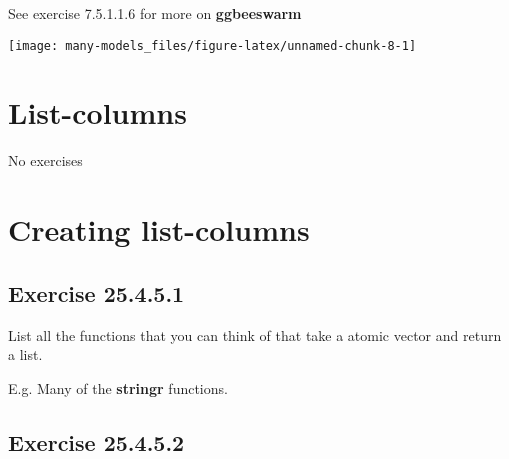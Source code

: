 \documentclass[]{book}
\newenvironment{Shaded}{\begin{snugshade}}{\end{snugshade}}
\newcommand{\DataTypeTok}[1]{\textcolor[rgb]{0.13,0.29,0.53}{#1}}
\newcommand{\KeywordTok}[1]{\textcolor[rgb]{0.13,0.29,0.53}{\textbf{#1}}}
\newcommand{\NormalTok}[1]{#1}
\newcommand{\OperatorTok}[1]{\textcolor[rgb]{0.81,0.36,0.00}{\textbf{#1}}}
\newcommand{\OtherTok}[1]{\textcolor[rgb]{0.56,0.35,0.01}{#1}}
\newcommand{\StringTok}[1]{\textcolor[rgb]{0.31,0.60,0.02}{#1}}
\theoremstyle{plain}
\theoremstyle{remark}
\begin{document}
See exercise 7.5.1.1.6 for more on \textbf{ggbeeswarm}

\begin{Shaded}
\end{Shaded}

\begin{center}\texttt{[image: many-models\_files/figure-latex/unnamed-chunk-8-1]} \end{center}

\hypertarget{list-columns}{%
\section{List-columns}\label{list-columns}}

No exercises

\hypertarget{creating-list-columns}{%
\section{Creating list-columns}\label{creating-list-columns}}

\hypertarget{exercise-25.4.5.1}{%
\subsection*{\texorpdfstring{Exercise
{25.4.5.1}}{Exercise 25.4.5.1}}\label{exercise-25.4.5.1}}

List all the functions that you can think of that take a atomic vector
and return a list.

E.g. Many of the \textbf{stringr} functions.

\hypertarget{exercise-25.4.5.2}{%
\subsection*{\texorpdfstring{Exercise
{25.4.5.2}}{Exercise 25.4.5.2}}\label{exercise-25.4.5.2}}
\end{document}
